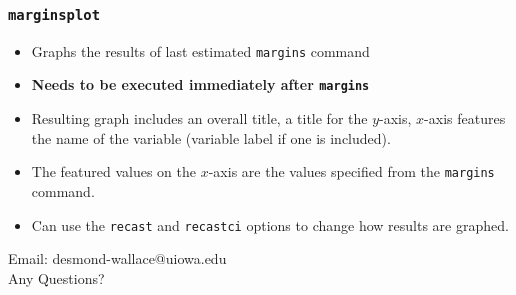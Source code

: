 \documentclass{beamer}
\begin{document}
\begin{frame}
	\frametitle{\texttt{marginsplot}}
	\begin{itemize}
		\item Graphs the results of last estimated \texttt{margins} command
		\item \textbf{Needs to be executed immediately after \texttt{margins}}
		\item Resulting graph includes an overall title, a title for the $y$-axis, $x$-axis features the name of the variable (variable label if one is included).
		\item The featured values on the $x$-axis are the values specified from the \texttt{margins} command.
		\item Can use the \texttt{recast} and \texttt{recastci} options to change how results are graphed.
	\end{itemize} 
\end{frame}

\begin{frame}
	\begin{center}
		\begin{LARGE}
			Email: desmond-wallace@uiowa.edu\\
			Any Questions?
		\end{LARGE}
	\end{center}
\end{frame}
\end{document}
